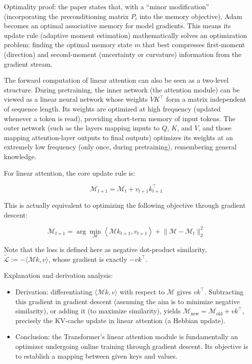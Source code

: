 Optimality proof: the paper states that, with a ``minor modification'' (incorporating the preconditioning matrix \(P_i\) into the memory objective), Adam becomes an optimal associative memory for model gradients. This means its update rule (adaptive moment estimation) mathematically solves an optimization problem: finding the optimal memory state \(m\) that best compresses first-moment (direction) and second-moment (uncertainty or curvature) information from the gradient stream.

The forward computation of linear attention can also be seen as a two-level structure. During pretraining, the inner network (the attention module) can be viewed as a linear neural network whose weights \(VK^\top\) form a matrix independent of sequence length. Its weights are optimized at high frequency (updated whenever a token is read), providing short-term memory of input tokens. The outer network (such as the layers mapping inputs to \(Q\), \(K\), and \(V\), and those mapping attention-layer outputs to final outputs) optimizes its weights at an extremely low frequency (only once, during pretraining), remembering general knowledge.

For linear attention, the core update rule is:

\[
\mathcal{M}_{t+1}=\mathcal{M}_t+v_{t+1}k_{t+1}^\top
\tag{16}
\]

This is actually equivalent to optimizing the following objective through gradient descent:

\[
\mathcal{M}_{t+1}=\arg\min_{\mathcal{M}}\left\langle \mathcal{M}k_{t+1},v_{t+1}\right\rangle+\lVert \mathcal{M}-\mathcal{M}_t\rVert_2^2
\tag{15}
\]

Note that the loss is defined here as negative dot-product similarity, \(\tilde{\mathcal{L}}:=-\langle \mathcal{M}k,v\rangle\), whose gradient is exactly \(-vk^\top\).

Explanation and derivation analysis:

\begin{itemize}
\tightlist
\item
  Derivation: differentiating \(\langle \mathcal{M}k,v\rangle\) with respect to \(\mathcal{M}\) gives \(vk^\top\). Subtracting this gradient in gradient descent (assuming the aim is to minimize negative similarity), or adding it (to maximize similarity), yields \(\mathcal{M}_{\mathrm{new}}=\mathcal{M}_{\mathrm{old}}+vk^\top\), precisely the KV-cache update in linear attention (a Hebbian update).
\item
  Conclusion: the Transformer's linear attention module is fundamentally an optimizer undergoing online training through gradient descent. Its objective is to establish a mapping between given keys and values.
\end{itemize}

